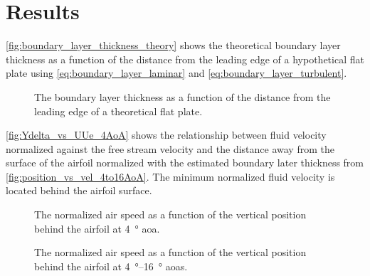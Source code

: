 \chapter{Results}
\label{cp:results}

\autoref{fig:boundary_layer_thickness_theory} shows the theoretical boundary layer thickness as a function of the distance from the leading edge of a hypothetical flat plate using \autoref{eq:boundary_layer_laminar} and \autoref{eq:boundary_layer_turbulent}.

\begin{figure}[htpb]
    \centering
    
    \caption[A graph of the boundary layer thickness vs distance from the leading edge.]{The boundary layer thickness as a function of the distance from the leading edge of a theoretical flat plate.}
    \label{fig:boundary_layer_thickness_theory}
\end{figure}

\autoref{fig:Ydelta_vs_UUe_4AoA} shows the relationship between fluid velocity normalized against the free stream velocity and the distance away from the surface of the airfoil normalized with the estimated boundary later thickness from \autoref{fig:position_vs_vel_4to16AoA}. The minimum normalized fluid velocity is located behind the airfoil surface.

\begin{figure}[htpb]
    \centering
    
    \caption[A graph of the normalized air speed as a function of the position behind the airfoil at a four degree angle of attack.]{The normalized air speed as a function of the vertical position behind the airfoil at \qty{4}{\degree} \acrshort{aoa}.}
    \label{fig:Ydelta_vs_UUe_4AoA}
\end{figure}

\begin{figure}[htpb]
    \centering
    
    \caption[A graph of the normalized air speed as a function of the position behind the airfoil at different angles of attack.]{The normalized air speed as a function of the vertical position behind the airfoil at \qtyrange{4}{16}{\degree} \acrshort{aoa}s.}
    \label{fig:position_vs_vel_4to16AoA}
\end{figure}

